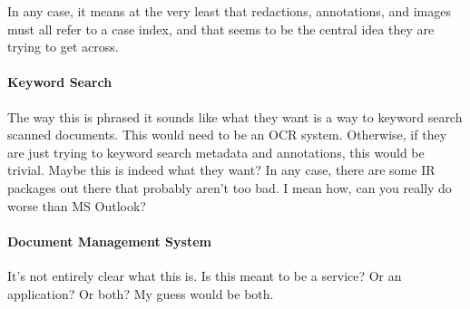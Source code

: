 In any case, it means at the very least that redactions, annotations, and
images must all refer to a case index, and that seems to be the central idea
they are trying to get across.

\paragraph{Keyword Search}The way this is phrased it sounds like what they want
is a way to keyword search scanned documents.  This would need to be an OCR
system.  Otherwise, if they are just trying to keyword search metadata and
annotations, this would be trivial.  Maybe this is indeed what they want?  In
any case, there are some IR packages out there that probably aren't too bad.  I
mean how, can you really do worse than MS Outlook?

\paragraph{Document Management System}It's not entirely clear what this is.  Is
this meant to be a service?  Or an application?  Or both?  My guess would be
both.

